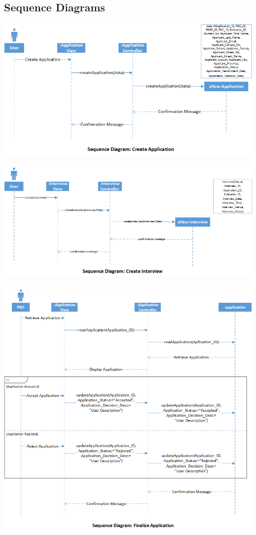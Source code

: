 \documentclass{article}
\begin{document}
\subsection{Sequence Diagrams}
\includegraphics[scale=0.7]{CreateApplicationSD.png} \\ \\
\includegraphics[scale=0.7]{CreateInterviewSD.png} \\ \\
\includegraphics[scale=0.7]{FinalizeApplicationSD.png} \\ \\
\end{document}
